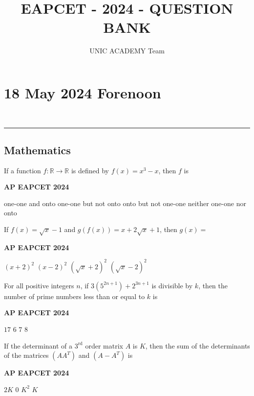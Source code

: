 \documentclass[11pt,paper=a4,answers]{exam}
\begin{document}
\title{EAPCET - 2024 - QUESTION BANK}
\author{UNIC ACADEMY Team}
\maketitle
\newpage

\section*{18 May 2024 Forenoon}
\noindent \\
\rule{\textwidth}{1.4pt}


\subsection*{Mathematics}

\begin{multicols}{2}
\begin{questions}

\question
If a function $f: \mathbb{R} \rightarrow \mathbb{R}$ is defined by $f(x) = x^3 - x$, then $f$ is
\begin{flushright}
\small\textbf{AP EAPCET 2024}
\end{flushright}
\begin{choices}
  \choice one-one and onto
  \choice one-one but not onto
  \choice onto but not one-one
  \choice neither one-one nor onto
\end{choices}

\question
If $f(x) = \sqrt{x} - 1$ and $g(f(x)) = x + 2\sqrt{x} + 1$, then $g(x) =$ 
\begin{flushright}
\small\textbf{AP EAPCET 2024}
\end{flushright}
\begin{choices}
  \choice $(x + 2)^2$
  \choice $(x - 2)^2$
  \choice $(\sqrt{x} + 2)^2$
  \choice $(\sqrt{x} - 2)^2$
\end{choices}

\question
For all positive integers $n$, if $3\left(5^{2n+1}\right) + 2^{3n+1}$ is divisible by $k$, then the number of prime numbers less than or equal to $k$ is
\begin{flushright}
\small\textbf{AP EAPCET 2024}
\end{flushright}
\begin{choices}
  \choice $17$ 
  \choice $6$ 
  \choice $7$ 
  \choice $8$ 
\end{choices}


\question
If the determinant of a $3^{\text{rd}}$ order matrix $A$ is $K$, then the sum of the determinants of the matrices $(AA^T)$ and $(A-A^T)$ is
\begin{flushright}
\small\textbf{AP EAPCET 2024}
\end{flushright}
\begin{choices}
  \choice $2K$ 
  \choice $0$ 
  \choice $K^2$ 
  \choice $K$ 
\end{choices}



\end{questions}
\end{multicols}
\end{document}
